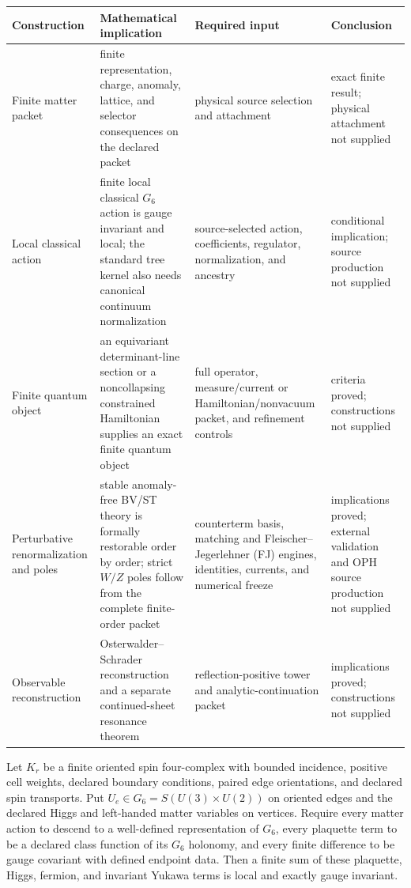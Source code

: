 \begin{center}
\small
\begin{tabular}{@{}>{\raggedright\arraybackslash}p{}
>{\raggedright\arraybackslash}p{}
>{\raggedright\arraybackslash}p{}
>{\raggedright\arraybackslash}p{}@{}}
\toprule
Construction & Mathematical implication & Required input & Conclusion \\
\midrule
Finite matter packet & finite representation, charge, anomaly, lattice, and selector consequences on the declared packet
& physical source selection and attachment
& exact finite result; physical attachment not supplied \\
Local classical action & finite local classical \(G_6\) action is gauge invariant and local; the standard tree kernel also needs canonical continuum normalization
& source-selected action, coefficients, regulator, normalization, and ancestry
& conditional implication; source production not supplied \\
Finite quantum object & an equivariant determinant-line section or a noncollapsing constrained Hamiltonian supplies an exact finite quantum object
& full operator, measure/current or Hamiltonian/nonvacuum packet, and refinement controls
& criteria proved; constructions not supplied \\
Perturbative renormalization and poles & stable anomaly-free BV/ST theory is formally restorable order by order; strict \(W/Z\) poles follow from the complete finite-order packet
& counterterm basis, matching and Fleischer--Jegerlehner (FJ) engines, identities, currents, and numerical freeze
& implications proved; external validation and OPH source production not supplied \\
Observable reconstruction & Osterwalder--Schrader reconstruction and a separate continued-sheet resonance theorem
& reflection-positive tower and analytic-continuation packet
& implications proved; constructions not supplied \\
\bottomrule
\end{tabular}
\end{center}

\begin{theorem}
\label{thm:qft-q1-finite-local-g6}
Let \(K_r\) be a finite oriented spin four-complex with bounded incidence,
positive cell weights, declared boundary conditions, paired edge orientations,
and declared spin transports. Put \(U_e\in
G_6=S(U(3)\times U(2))\) on oriented edges and the declared Higgs and
left-handed matter variables on vertices. Require every matter action to
descend to a well-defined representation of \(G_6\), every plaquette term to be a
declared class function of its \(G_6\) holonomy, and every finite difference
to be gauge covariant with defined endpoint data. Then a finite sum of these
plaquette, Higgs, fermion, and invariant Yukawa terms is local and exactly
gauge invariant.
\end{theorem}


